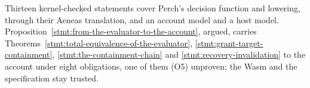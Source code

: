 Thirteen kernel-checked statements cover Perch's decision function and lowering,
through their Aeneas translation, and an account model and a host model.
Proposition~\ref{stmt:from-the-evaluator-to-the-account}, argued, carries
Theorems~\ref{stmt:total-equivalence-of-the-evaluator},
\ref{stmt:grant-target-containment}, \ref{stmt:the-containment-chain} and
\ref{stmt:recovery-invalidation} to the account under eight obligations, one of
them (O5) unproven; the Wasm and the specification stay trusted.
